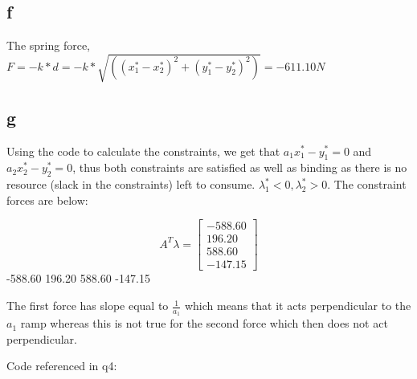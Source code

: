 \documentclass[10pt]{article}
\begin{document}
\subsection{f}
The spring force, $F = -k*d = -k * \sqrt{((x_1^* - x_2^*)^2 + (y_1^* - y_2^*)^2)} = -611.10N$

\subsection{g}
Using the code to calculate the constraints, we get that $ a_1x_1^* -y_1^* = 0$ and $a_2x_2^* - y_2^* = 0$, thus both constraints are satisfied as well as binding as there is no resource (slack in the constraints) left to consume. $\lambda_1^* < 0, \lambda_2^* > 0$. The constraint forces are below:

\[
A^T \lambda = 
\begin{bmatrix}
  -588.60 \\
   196.20 \\
   588.60 \\
  -147.15
\end{bmatrix}
\]
  -588.60
   196.20
   588.60
  -147.15

The first force has slope equal to $\frac{1}{a_1}$ which means that it acts perpendicular to the $a_1$ ramp whereas this is not true for the second force which then does not act perpendicular.

Code referenced in q4:

\end{document}
